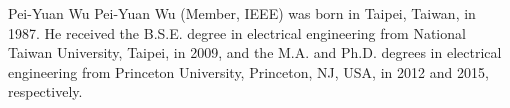 \documentclass[journal]{IEEEtai}
\begin{document}
\begin{IEEEbiography}{Pei-Yuan Wu}
	Pei-Yuan Wu (Member, IEEE) was born in Taipei,
	Taiwan, in 1987. He received the B.S.E. degree
	in electrical engineering from National Taiwan
	University, Taipei, in 2009, and the M.A. and Ph.D.
	degrees in electrical engineering from Princeton
	University, Princeton, NJ, USA, in 2012 and 2015,
	respectively.
\end{IEEEbiography}
\end{document}
